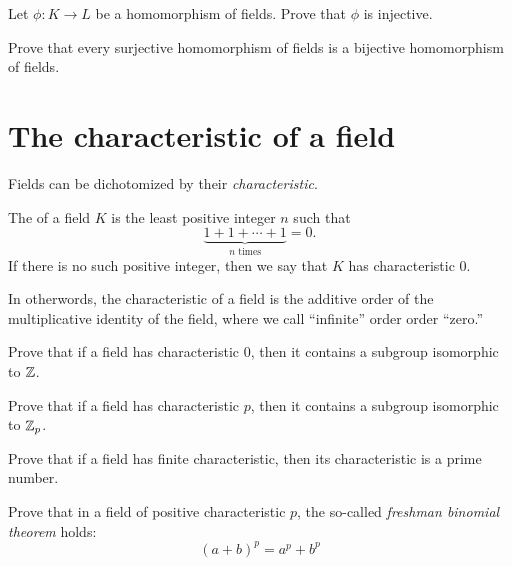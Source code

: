 \documentclass{ximera}
\begin{document}
\begin{exercise}
  Let $\phi:K\to L$ be a homomorphism of fields. Prove that $\phi$ is
  injective.
\end{exercise}

\begin{exercise}
  Prove that every surjective homomorphism of fields is a bijective
  homomorphism of fields.
\end{exercise}







\section{The characteristic of a field}


Fields can be dichotomized by their \textit{characteristic}.

\begin{definition}
The  of a field $K$ is the least positive
integer $n$ such that
\[
\underbrace{1 + 1 + \cdots +1}_{\text{$n$ times}} =0.
\]
If there is no such positive integer, then we say that $K$ has
characteristic $0$.


In otherwords, the characteristic of a field is the additive order of
the multiplicative identity of the field, where we call ``infinite''
order order ``zero.''
\end{definition}


\begin{exercise}
  Prove that if a field has characteristic $0$, then it contains a
  subgroup isomorphic to $\mathbb Z$.
\end{exercise}

\begin{exercise}
  Prove that if a field has characteristic $p$, then it contains a
  subgroup isomorphic to $\mathbb Z_p$.
\end{exercise}



\begin{exercise}\label{E:fcp}
Prove that if a field has finite characteristic, then its
characteristic is a prime number.
\end{exercise}

\begin{exercise}\label{E:FBT}
Prove that in a field of positive characteristic $p$, the so-called
\textit{freshman binomial theorem} holds:
\[
(a+b)^p = a^p + b^p
\]
\end{exercise}
\end{document}
